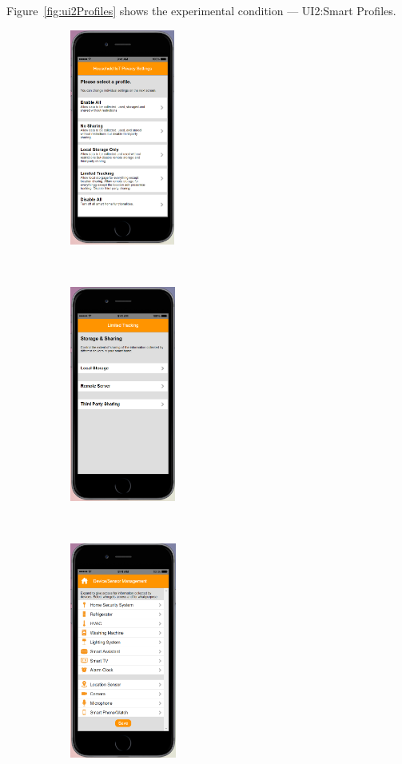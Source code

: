 \begin{appendices}
Figure~\ref{fig:ui2Profiles} shows the experimental condition --- UI2:Smart Profiles.
\begin{figure}[htb]
	\centering
	\begin{subfigure}[t]{0.2\textwidth}
		\centering
		\includegraphics[height=2.8in]{figures/ui2sp1.png}
	\end{subfigure}%
	~~~~~
	\begin{subfigure}[t]{0.2\textwidth}
		\centering
		\includegraphics[height=2.8in]{figures/ui2sp2.png}
	\end{subfigure}%
	~~~~~
	\begin{subfigure}[t]{0.2\textwidth}
		\centering
		\includegraphics[height=2.8in]{figures/ui1sp3.png}

\end{subfigure}
\end{figure}
\end{appendices}

